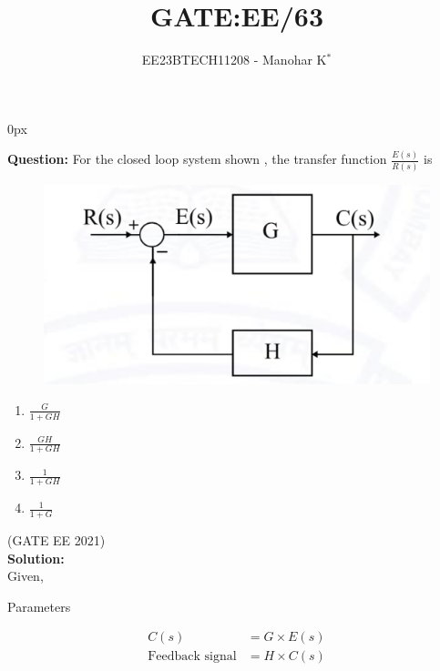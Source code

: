 \documentclass[journal,12pt,twocolumn]{IEEEtran}
\begin{document}
	\parindent 0px
	
	
	\vspace{3cm}
	
	\title{GATE:EE/63}
	\author{EE23BTECH11208 - Manohar K$^{*}$
	}
	\maketitle
	\newpage
	\bigskip
	
	
	
	
\textbf{Question:} For the closed loop system shown , the transfer function $\frac{E(s)}{R(s)}$ is \\
\begin{figure}[ht]
	\centering
	\includegraphics[width=1\linewidth]{figs/questiondia.png}
\end{figure}
\begin{enumerate}[label = (\alph*)]
	\item $\frac{G}{1+GH}$
	\item $\frac{GH}{1+GH}$
	\item $\frac{1}{1+GH}$
	\item $\frac{1}{1+G}$
\end{enumerate} \hfill{(GATE EE 2021)}\\



 \noindent \textbf{Solution:}\\
	Given,\\
	
	\begin{table}[h]
		\centering
		
		\caption{Parameters}
		\label{tab:GATE.EE.2021.11}
	\end{table}
	
	\begin{align}
		C(s)&=G \times E(s)\\
		\text{Feedback signal} &= H \times C(s)
	\end{align}
	    
\end{document}
